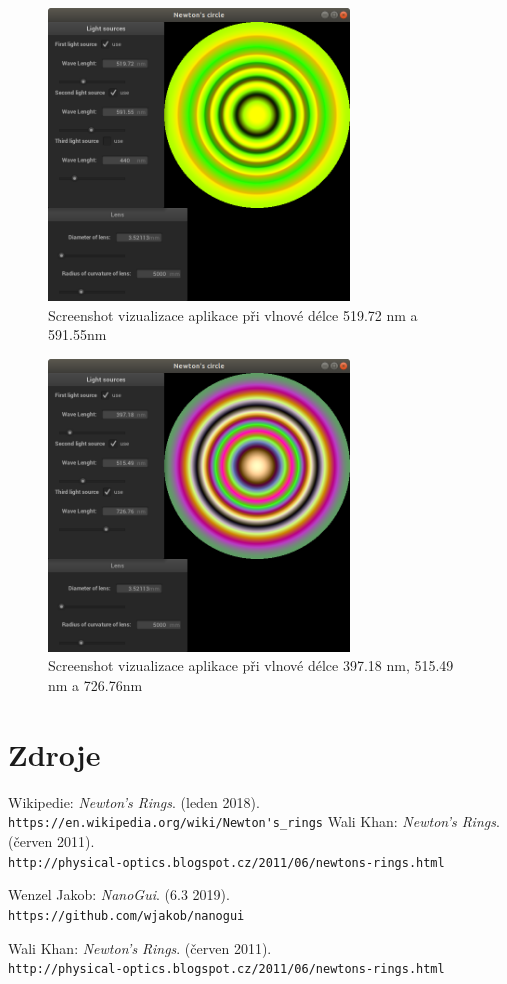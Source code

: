 \documentclass[a4paper, 12pt]{article}
\begin{document}
  \begin{figure}
	\begin{center}
		
		\includegraphics[width=8cm]{sc3}
		\caption{Screenshot vizualizace aplikace  při vlnové délce 519.72 nm a 591.55nm}
		\label{sc3}
	\end{center}
\end{figure}
  \begin{figure}
	\begin{center}
		
		\includegraphics[width=8cm]{sc4}
		\caption{Screenshot vizualizace aplikace  při vlnové délce 397.18 nm, 515.49 nm a 726.76nm}
		\label{sc4}
	\end{center}
\end{figure}
\pagebreak
\section{Zdroje}
\begin{thebibliography}{zdroj}
	 Wikipedie:
	\emph{Newton's Rings}. (leden 2018).\\
	\verb|https://en.wikipedia.org/wiki/Newton's_rings|
	 Wali Khan:
	\emph{Newton's Rings}. (červen 2011).\\
	\verb|http://physical-optics.blogspot.cz/2011/06/newtons-rings.html|
	
	 Wenzel Jakob:
	\emph{NanoGui}. (6.3 2019).\\
	\verb|https://github.com/wjakob/nanogui|
	
	 Wali Khan:
	\emph{Newton's Rings}. (červen 2011).\\
	\verb|http://physical-optics.blogspot.cz/2011/06/newtons-rings.html|
\end{thebibliography}
\end{document}
